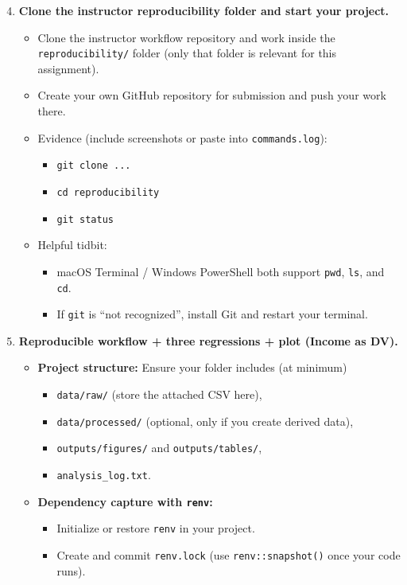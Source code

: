 \documentclass[11pt]{article}
\begin{document}
\bigskip
\begin{enumerate}
\setcounter{enumi}{3}
\item \textbf{Clone the instructor reproducibility folder and start your project.}
\begin{itemize}
  \item Clone the instructor workflow repository and work inside the \texttt{reproducibility/} folder (only that folder is relevant for this assignment).
  \item Create your own GitHub repository for submission and push your work there.
  \item Evidence (include screenshots or paste into \texttt{commands.log}):
  \begin{itemize}
    \item \texttt{git clone ...}
    \item \texttt{cd reproducibility}
    \item \texttt{git status}
  \end{itemize}
  \item Helpful tidbit:
  \begin{itemize}
    \item macOS Terminal / Windows PowerShell both support \texttt{pwd}, \texttt{ls}, and \texttt{cd}.
    \item If \texttt{git} is ``not recognized'', install Git and restart your terminal.
  \end{itemize}
\end{itemize}

\item \textbf{Reproducible workflow + three regressions + plot (Income as DV).}
\begin{itemize}
  \item \textbf{Project structure:} Ensure your folder includes (at minimum)
  \begin{itemize}
    \item \texttt{data/raw/} (store the attached CSV here),
    \item \texttt{data/processed/} (optional, only if you create derived data),
    \item \texttt{outputs/figures/} and \texttt{outputs/tables/},
    \item \texttt{analysis\_log.txt}.
  \end{itemize}

  \item \textbf{Dependency capture with \texttt{renv}:}
  \begin{itemize}
    \item Initialize or restore \texttt{renv} in your project.
    \item Create and commit \texttt{renv.lock} (use \texttt{renv::snapshot()} once your code runs).
  \end{itemize}


\end{itemize}
\end{enumerate}
\end{document}
